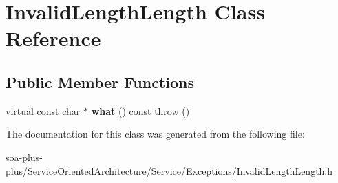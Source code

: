 \hypertarget{class_invalid_length_length}{
\section{InvalidLengthLength Class Reference}
\label{class_invalid_length_length}
}
\subsection*{Public Member Functions}
\begin{DoxyCompactItemize}
\item 
\hypertarget{class_invalid_length_length_af5e3d9176c4a1f405892cf033441fd9c}{
virtual const char $\ast$ {\bfseries what} () const   throw ()}
\label{class_invalid_length_length_af5e3d9176c4a1f405892cf033441fd9c}

\end{DoxyCompactItemize}


The documentation for this class was generated from the following file:\begin{DoxyCompactItemize}
\item 
soa-\/plus-\/plus/ServiceOrientedArchitecture/Service/Exceptions/InvalidLengthLength.h\end{DoxyCompactItemize}
